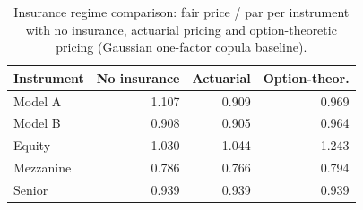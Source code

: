 
\begin{table}[ht]
\centering
\caption{Insurance regime comparison: fair price / par per instrument with no insurance, actuarial pricing and option-theoretic pricing (Gaussian one-factor copula baseline).}
\label{tab:insurance-comparison}
\small
\begin{tabular}{l r r r}
\toprule
Instrument & No insurance & Actuarial & Option-theor. \\
\midrule
Model A & 1.107 & 0.909 & 0.969 \\
Model B & 0.908 & 0.905 & 0.964 \\
Equity & 1.030 & 1.044 & 1.243 \\
Mezzanine & 0.786 & 0.766 & 0.794 \\
Senior & 0.939 & 0.939 & 0.939 \\
\bottomrule
\end{tabular}
\end{table}
